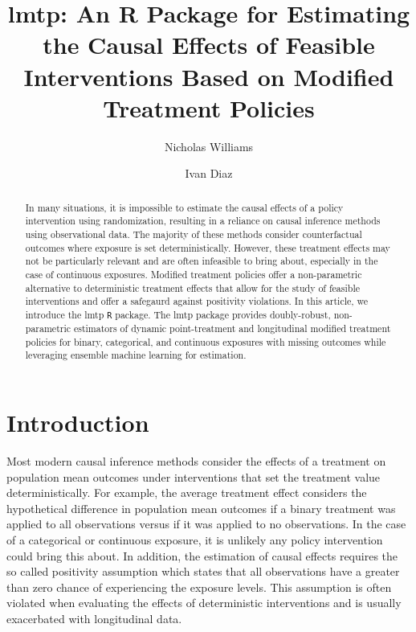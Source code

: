 \documentclass[]{elsarticle} %
\begin{document}
\begin{frontmatter}

  \title{lmtp: An R Package for Estimating the Causal Effects of
Feasible Interventions Based on Modified Treatment Policies}
    \author[a]{Nicholas Williams}
    \author[a]{Ivan Diaz}
  
      \address[a]{Division of Biostatistics, Department of Population
Health Sciences, Weill Cornell Medical College, 402 E. 67th Street, New
York, NY, 10065}
  
  \begin{abstract}
  In many situations, it is impossible to estimate the causal effects of
  a policy intervention using randomization, resulting in a reliance on
  causal inference methods using observational data. The majority of
  these methods consider counterfactual outcomes where exposure is set
  deterministically. However, these treatment effects may not be
  particularly relevant and are often infeasible to bring about,
  especially in the case of continuous exposures. Modified treatment
  policies offer a non-parametric alternative to deterministic treatment
  effects that allow for the study of feasible interventions and offer a
  safegaurd against positivity violations. In this article, we introduce
  the lmtp \texttt{R} package. The lmtp package provides doubly-robust,
  non-parametric estimators of dynamic point-treatment and longitudinal
  modified treatment policies for binary, categorical, and continuous
  exposures with missing outcomes while leveraging ensemble machine
  learning for estimation.
  \end{abstract}
  
 \end{frontmatter}

\hypertarget{introduction}{%
\section{Introduction}\label{introduction}}

Most modern causal inference methods consider the effects of a treatment
on population mean outcomes under interventions that set the treatment
value deterministically. For example, the average treatment effect
considers the hypothetical difference in population mean outcomes if a
binary treatment was applied to all observations versus if it was
applied to no observations. In the case of a categorical or continuous
exposure, it is unlikely any policy intervention could bring this about.
In addition, the estimation of causal effects requires the so called
positivity assumption which states that all observations have a greater
than zero chance of experiencing the exposure levels. This assumption is
often violated when evaluating the effects of deterministic
interventions and is usually exacerbated with longitudinal data.
\end{document}
